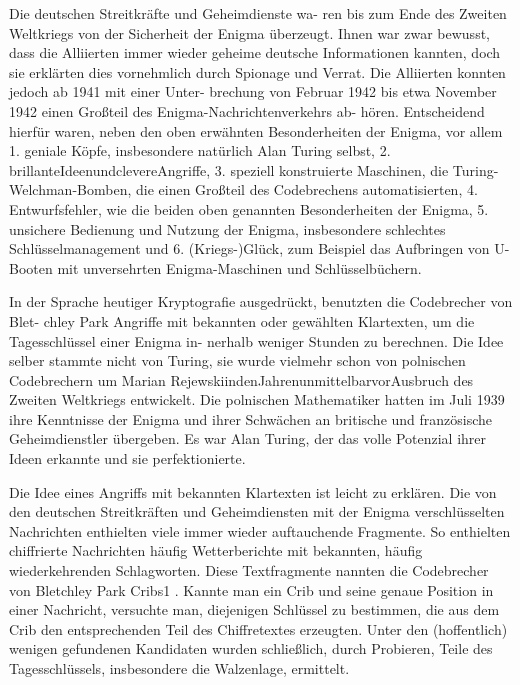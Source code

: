 Die deutschen Streitkräfte und Geheimdienste wa- ren bis zum Ende des Zweiten Weltkriegs von der Sicherheit der Enigma überzeugt. Ihnen war zwar bewusst, dass die Alliierten immer wieder geheime deutsche Informationen kannten, doch sie erklärten dies vornehmlich durch Spionage und Verrat. Die Alliierten konnten jedoch ab 1941 mit einer Unter- brechung von Februar 1942 bis etwa November 1942 einen Großteil des Enigma-Nachrichtenverkehrs ab- hören. Entscheidend hierfür waren, neben den oben erwähnten Besonderheiten der Enigma, vor allem
1. geniale Köpfe, insbesondere natürlich Alan Turing selbst,
2. brillanteIdeenundclevereAngriffe,
3. speziell konstruierte Maschinen, die Turing-
Welchman-Bomben, die einen Großteil des
Codebrechens automatisierten,
4. Entwurfsfehler, wie die beiden oben genannten
Besonderheiten der Enigma,
5. unsichere Bedienung und Nutzung der Enigma,
insbesondere schlechtes Schlüsselmanagement
und
6. (Kriegs-)Glück, zum Beispiel das Aufbringen von
U-Booten mit unversehrten Enigma-Maschinen und Schlüsselbüchern.

In der Sprache heutiger Kryptografie ausgedrückt, benutzten die Codebrecher von Blet- chley Park Angriffe mit bekannten oder gewählten Klartexten, um die Tagesschlüssel einer Enigma in- nerhalb weniger Stunden zu berechnen. Die Idee selber stammte nicht von Turing, sie wurde vielmehr schon von polnischen Codebrechern um Marian RejewskiindenJahrenunmittelbarvorAusbruch des Zweiten Weltkriegs entwickelt. Die polnischen Mathematiker hatten im Juli 1939 ihre Kenntnisse der Enigma und ihrer Schwächen an britische und französische Geheimdienstler übergeben. Es war Alan Turing, der das volle Potenzial ihrer Ideen erkannte und sie perfektionierte.

Die Idee eines Angriffs mit bekannten Klartexten ist leicht zu erklären. Die von den deutschen Streitkräften und Geheimdiensten mit der Enigma verschlüsselten Nachrichten enthielten viele immer wieder auftauchende Fragmente. So enthielten chiffrierte Nachrichten häufig Wetterberichte mit bekannten, häufig wiederkehrenden Schlagworten. Diese Textfragmente nannten die Codebrecher von Bletchley Park Cribs1 . Kannte man ein Crib und seine genaue Position in einer Nachricht, versuchte man, diejenigen Schlüssel zu bestimmen, die aus dem Crib den entsprechenden Teil des Chiffretextes erzeugten. Unter den (hoffentlich) wenigen gefundenen Kandidaten wurden schließlich, durch Probieren, Teile des Tagesschlüssels, insbesondere die Walzenlage, ermittelt.

